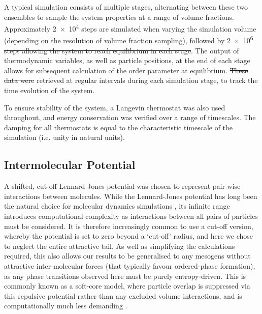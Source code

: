 \documentclass[11pt, a4paper]{article} %
\providecommand{\DIFadd}[1]{{\protect\color{blue}\uwave{#1}}} %
\providecommand{\DIFdel}[1]{{\protect\color{red}\sout{#1}}}                      %
\providecommand{\DIFaddbegin}{} %
\providecommand{\DIFaddend}{} %
\providecommand{\DIFdelbegin}{} %
\providecommand{\DIFdelend}{} %
\begin{document}
A typical simulation consists of multiple stages, alternating between these two ensembles to sample the system properties at a range of volume fractions. Approximately \num{2e4} steps are simulated when varying the simulation volume (depending on the resolution of volume fraction sampling), followed by \num{2e6} \DIFdelbegin \DIFdel{steps allowing the system to reach equilibrium in each stage}\DIFdelend \DIFaddbegin \DIFadd{\textcolor{forestgreen}{steps, allowing the system to reach equilibrium at each stage}}\DIFaddend . The output of thermodynamic variables, as well as particle positions, at the end of each stage allows for subsequent calculation of the order parameter at equilibrium. \DIFdelbegin \DIFdel{These data were }\DIFdelend \DIFaddbegin \DIFadd{\textcolor{forestgreen}{These data were} }\DIFaddend retrieved at regular intervals during each simulation stage, to track the time evolution of the system.

To ensure stability of the system, a Langevin thermostat \cite{Schneider1978} was also used throughout, and energy conservation was verified over a range of timescales. The damping for all thermostats is equal to the characteristic timescale of the simulation (i.e. unity in natural units).



\subsection{Intermolecular Potential} \label{pair_potential}
A shifted, cut-off Lennard-Jones potential was chosen to represent pair-wise interactions between molecules. While the Lennard-Jones potential \cite{Jones1924a, Jones1924b} has long been the natural choice for molecular dynamics simulations \cite{Stephan2019}, its infinite range introduces computational complexity as interactions between all pairs of particles must be considered. It is therefore increasingly common to use a cut-off version, whereby the potential is set to zero beyond a `cut-off' radius, and here we chose to neglect the entire attractive tail. As well as simplifying the calculations required, this also allows our results to be generalised to any mesogens without attractive inter-molecular forces (that typically favour ordered-phase formation), as any phase transitions observed here must be purely \DIFdelbegin \DIFdel{entropy-driven}\DIFdelend \DIFaddbegin \DIFadd{entropically driven}\DIFaddend . This is commonly known as a soft-core model, where particle overlap is suppressed via this repulsive potential rather than any excluded volume interactions, and is computationally much less demanding \cite{Paolini1993, Hughes2008}.
\end{document}
